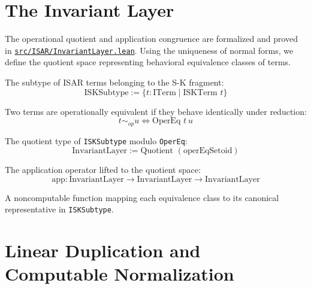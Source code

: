\section{The Invariant Layer}

The operational quotient and application congruence are formalized and proved in \href{https://github.com/cypoe/isar-proofs/blob/master/src/ISAR/InvariantLayer.lean}{\texttt{src/ISAR/InvariantLayer.lean}}. Using the uniqueness of normal forms, we define the quotient space representing behavioral equivalence classes of terms.

\begin{definition}[ISKSubtype]
The subtype of ISAR terms belonging to the S-K fragment:
$$\text{ISKSubtype} := \{ t : \text{ITerm} \mid \text{ISKTerm } t \}$$
\end{definition}

\begin{definition}
Two terms are operationally equivalent if they behave identically under reduction:
$$t \sim_{op} u \iff \text{OperEq } t\ u$$
\end{definition}

\begin{definition}
The quotient type of \texttt{ISKSubtype} modulo \texttt{OperEq}:
$$\text{InvariantLayer} := \text{Quotient } (\text{operEqSetoid})$$
\end{definition}

\begin{definition}
The application operator lifted to the quotient space:
$$\text{app} : \text{InvariantLayer} \to \text{InvariantLayer} \to \text{InvariantLayer}$$
\end{definition}

\begin{definition}
A noncomputable function mapping each equivalence class to its canonical representative in \texttt{ISKSubtype}.
\end{definition}

\section{Linear Duplication and Computable Normalization}

